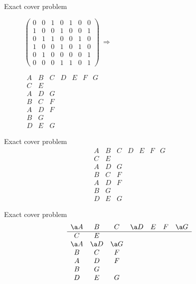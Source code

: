 \documentclass[xcolor=svgnames]{beamer}
\begin{document}
%
\begin{frame}{Exact cover problem}
\Large\boldmath
  \centering
  \begin{figure}[!htb]
    \begin{minipage}{.6\textwidth}
      \centering
      $\left(\begin{array}{ccccccc}
    0&0&1&0&1&0&0\\
    1&0&0&1&0&0&1\\
    0&1&1&0&0&1&0\\
    1&0&0&1&0&1&0\\
    0&1&0&0&0&0&1\\
    0&0&0&1&1&0&1
  \end{array}\right)\ \Rightarrow$
    \end{minipage}%
    \begin{minipage}{.4\textwidth}
      \centering
  $
  \begin{array}{ccccccc}
    A & B & C & D & E & F & G\\
    \hline
    C & E &&&&&\\
    A & D & G &&&&\\
    B & C & F &&&&\\
    A & D & F &&&&\\
    B & G &&&&&\\
    D & E & G &&&&
  \end{array}
  $
    \end{minipage}
\end{figure}
\end{frame}

\renewcommand\arraystretch{1.3}
%
\begin{frame}{Exact cover problem} 
\Large\boldmath
  $$
  \begin{array}{ccccccc}
    A & B & C & D & E & F & G\\
    \hline
    C & E &&&&&\\
    A & D & G &&&&\\
    B & C & F &&&&\\
    A & D & F &&&&\\
    B & G &&&&&\\
    D & E & G &&&&
  \end{array}
  $$
\end{frame}

%
\begin{frame}{Exact cover problem} 
\Large\boldmath
  $$
  \begin{array}{ccccccc}
    \a A & B & C & \a D & E & F & \a G\\
    \hline
    C & E &&&&&\\
    \a A & \a D & \a G &&&&\\
    B & C & F &&&&\\
    A & D & F &&&&\\
    B & G &&&&&\\
    D & E & G &&&&
  \end{array}
  $$
\end{frame}
\end{document}
